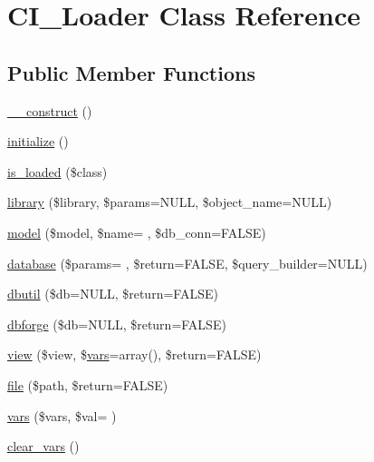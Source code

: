 \hypertarget{class_c_i___loader}{}\section{C\+I\+\_\+\+Loader Class Reference}
\label{class_c_i___loader}
\subsection*{Public Member Functions}
\begin{DoxyCompactItemize}
\item 
\hyperlink{class_c_i___loader_a095c5d389db211932136b53f25f39685}{\+\_\+\+\_\+construct} ()
\item 
\hyperlink{class_c_i___loader_a91098fa7d1917ce4833f284bbef12627}{initialize} ()
\item 
\hyperlink{class_c_i___loader_a57ba1b43ec1d58c07a2d1e8cd00b9658}{is\+\_\+loaded} (\$class)
\item 
\hyperlink{class_c_i___loader_a03207e0bcf58b6c9ecbc09fd2d8eab5d}{library} (\$library, \$params=N\+U\+L\+L, \$object\+\_\+name=N\+U\+L\+L)
\item 
\hyperlink{class_c_i___loader_a3f2fc35ce58c58b39980136502db18e8}{model} (\$model, \$name= \textquotesingle{}\textquotesingle{}, \$db\+\_\+conn=F\+A\+L\+S\+E)
\item 
\hyperlink{class_c_i___loader_a26d0a78fe7f28effcc1585d544700bd4}{database} (\$params= \textquotesingle{}\textquotesingle{}, \$return=F\+A\+L\+S\+E, \$query\+\_\+builder=N\+U\+L\+L)
\item 
\hyperlink{class_c_i___loader_a9b841fe10e3083b4c3266359a42cf8f8}{dbutil} (\$db=N\+U\+L\+L, \$return=F\+A\+L\+S\+E)
\item 
\hyperlink{class_c_i___loader_acce260e75c2c0525d626241970dbcf8c}{dbforge} (\$db=N\+U\+L\+L, \$return=F\+A\+L\+S\+E)
\item 
\hyperlink{class_c_i___loader_a338c66f36b2406ff1e14e7d64515b40c}{view} (\$view, \$\hyperlink{class_c_i___loader_af116bc32c4f3eba4af86b17dff5edf27}{vars}=array(), \$return=F\+A\+L\+S\+E)
\item 
\hyperlink{class_c_i___loader_a47e4b8eda2bbf9e8bb505cdafb8e4ba5}{file} (\$path, \$return=F\+A\+L\+S\+E)
\item 
\hyperlink{class_c_i___loader_af116bc32c4f3eba4af86b17dff5edf27}{vars} (\$vars, \$val= \textquotesingle{}\textquotesingle{})
\item 
\hyperlink{class_c_i___loader_a62226f7423f098251274c81586b7a8bf}{clear\+\_\+vars} ()

\end{DoxyCompactItemize}
